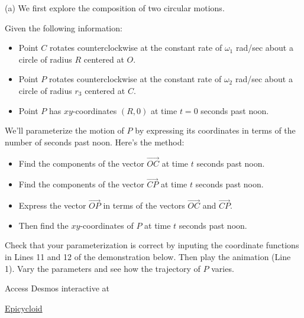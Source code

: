 \documentclass{ximera}
\begin{document}
\begin{exploration}  \label{Edst4hnt}
(a) We first explore the composition of two circular motions.

Given the following information:
\begin{itemize}

\item{Point $C$ rotates counterclockwise  at the constant rate of $\omega_1$ rad/sec about a circle of radius $R$ centered at $O$.}

\item{Point $P$ rotates counterclockwise at the constant rate of $\omega_2$ rad/sec about a circle of radius $r_3$ centered at $C$.}


\item{Point $P$ has $xy$-coordinates $(R , 0)$ at time $t=0$ seconds past noon.}

\end{itemize}


We'll parameterize the motion of $P$ by expressing its coordinates in terms of the number of seconds past noon. Here's the method:

\begin{itemize}

\item{Find the components of the vector $\overrightarrow{OC}$ at time $t$ seconds past noon.}

\item{Find the components of the vector $\overrightarrow{CP}$ at time $t$ seconds past noon.}



\item{Express the vector $\overrightarrow{OP}$ in terms of the vectors $\overrightarrow{OC}$ and $\overrightarrow{CP}$.}

\item{Then find the $xy$-coordinates of $P$ at time $t$ seconds past noon.}

\end{itemize}


Check that your parameterization is correct by inputing the coordinate functions in Lines 11 and 12 of the demonstration below. Then play the animation (Line 1). Vary the parameters and see how the trajectory of $P$ varies.

Access Desmos interactive at
 
\href{https://www.desmos.com/calculator/c2i8y3oaxe}{Epicycloid}


\end{exploration}
\end{document}
